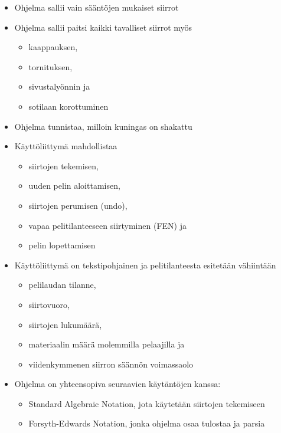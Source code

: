 \documentclass[12pt]{article}
\begin{document}
\begin{itemize}

\item Ohjelma sallii vain sääntöjen mukaiset siirrot

\item Ohjelma sallii paitsi kaikki tavalliset siirrot myös
\begin{itemize}
\item kaappauksen,
\item tornituksen,
\item sivustalyönnin ja
\item sotilaan korottuminen
\end{itemize}

\item Ohjelma tunnistaa, milloin kuningas on shakattu

\item Käyttöliittymä mahdollistaa
\begin{itemize}
\item siirtojen tekemisen,
\item uuden pelin aloittamisen,
\item siirtojen perumisen (undo),
\item vapaa pelitilanteeseen siirtyminen (FEN) ja
\item pelin lopettamisen
\end{itemize}

\item Käyttöliittymä on tekstipohjainen ja pelitilanteesta esitetään vähiintään
\begin{itemize}
\item pelilaudan tilanne,
\item siirtovuoro,
\item siirtojen lukumäärä,
\item materiaalin määrä molemmilla pelaajilla ja
\item viidenkymmenen siirron säännön voimassaolo
\end{itemize}

\item Ohjelma on yhteensopiva seuraavien käytäntöjen kanssa:
\begin{itemize}
\item Standard Algebraic Notation, jota käytetään siirtojen tekemiseen
\item Forsyth-Edwards Notation, jonka ohjelma osaa tulostaa ja parsia
\end{itemize}

\end{itemize}
\end{document}
